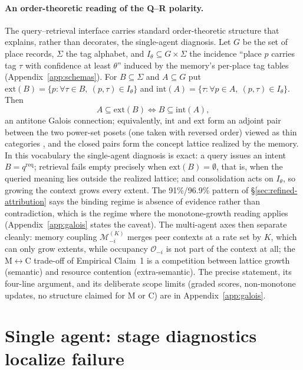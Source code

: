 \documentclass{article}
\begin{document}
\paragraph{An order-theoretic reading of the Q--R polarity.}
The query--retrieval interface carries standard order-theoretic structure that explains, rather than decorates, the single-agent diagnosis. Let $G$ be the set of place records, $\Sigma$ the tag alphabet, and $I_\theta \subseteq G\times\Sigma$ the incidence ``place $p$ carries tag $\tau$ with confidence at least $\theta$'' induced by the memory's per-place tag tables (Appendix~\ref{app:schemas}). For $B\subseteq\Sigma$ and $A\subseteq G$ put $\mathrm{ext}(B)=\{p : \forall\tau\in B,\ (p,\tau)\in I_\theta\}$ and $\mathrm{int}(A)=\{\tau : \forall p\in A,\ (p,\tau)\in I_\theta\}$. Then
\[
A \subseteq \mathrm{ext}(B) \iff B \subseteq \mathrm{int}(A),
\]
an antitone Galois connection; equivalently, $\mathrm{int}$ and $\mathrm{ext}$ form an adjoint pair between the two power-set posets (one taken with reversed order) viewed as thin categories \citep{ganter1999fca,maclane1998categories}, and the closed pairs form the concept lattice realized by the memory. In this vocabulary the single-agent diagnosis is exact: a query issues an intent $B = q^{\mathrm{req}}$; retrieval fails empty precisely when $\mathrm{ext}(B)=\emptyset$, that is, when the queried meaning lies outside the realized lattice; and consolidation acts on $I_\theta$, so growing the context grows every extent. The 91\%/96.9\% pattern of \S\ref{sec:refined-attribution} says the binding regime is absence of evidence rather than contradiction, which is the regime where the monotone-growth reading applies (Appendix~\ref{app:galois} states the caveat). The multi-agent axes then separate cleanly: memory coupling $\mathcal{M}^{(K)}_{-i}$ merges peer contexts at a rate set by $K$, which can only grow extents, while occupancy $\mathcal{O}_{-i}$ is not part of the context at all; the M$\leftrightarrow$C trade-off of Empirical Claim~1 is a competition between lattice growth (semantic) and resource contention (extra-semantic). The precise statement, its four-line argument, and its deliberate scope limits (graded scores, non-monotone updates, no structure claimed for M or C) are in Appendix~\ref{app:galois}.

\section{Single agent: stage diagnostics localize failure}
\label{sec:single}
\end{document}
